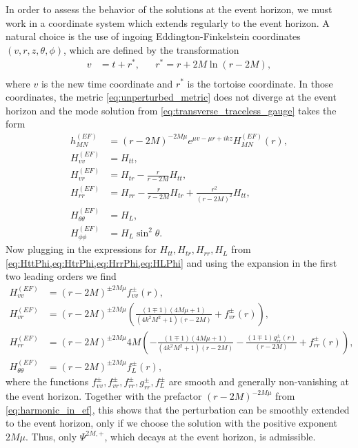 \documentclass[11pt,aip,jmp,amsmath,amssymb,draft]{revtex4-1}
\begin{document}
In order to assess the behavior of the solutions at the event horizon, we must work in a coordinate system which extends regularly to the event horizon. 
A natural choice is the use of ingoing Eddington-Finkelstein coordinates $(v,r,z,\theta,\phi)$, which are defined by the transformation
\begin{align}
    v &= t + r^*, && r^*= r + 2M \ln(r-2M), \\
\end{align}
where $v$ is the new time coordinate and $r^*$ is the tortoise coordinate. 
In those coordinates, the metric \cref{eq:unperturbed_metric} does not diverge at the event horizon and the mode solution from \cref{eq:transverse_traceless_gauge} takes the form
\begin{align}
    h_{MN}^{(EF)} &= (r-2M)^{-2M\mu} e^{\mu v - \mu r + ikz} H_{MN}^{(EF)}(r), \label{eq:harmonic_in_ef} \\
    H_{vv}^{(EF)} &= H_{tt}, \\
    H_{vr}^{(EF)} &= H_{tr} - \frac{r}{r-2M}H_{tt}, \\
    H_{rr}^{(EF)} &= H_{rr} - \frac{r}{r-2M}H_{tr} + \frac{r^2}{(r-2M)^2} H_{tt},\\ 
    H_{\theta\theta}^{(EF)} &= H_L, \\
    H_{\phi\phi}^{(EF)} &= H_L \sin^2\theta.
\end{align}
Now plugging in the expressions for $H_{tt}, H_{tr}, H_{rr}, H_L$ from \cref{eq:HttPhi,eq:HtrPhi,eq:HrrPhi,eq:HLPhi} and using the expansion in the first two leading orders we find
\begin{align}
    H_{vv}^{(EF)} &= (r-2M)^{\pm 2M\mu}f_{vv}^{\pm}(r),\\
    H_{vr}^{(EF)} &= (r-2M)^{\pm 2M\mu}\left(\frac{(1\mp 1) (4 M \mu+1)}{\left(4 k^2 M^2+1\right) (r-2 M)} + f_{vr}^{\pm}(r)\right),\\
    H_{rr}^{(EF)} &= (r-2M)^{\pm 2M\mu}4M\left(-\frac{(1\mp 1) (4 M \mu+1)}{\left(4 k^2 M^2+1\right) (r-2 M)} - \frac{(1\mp 1)g_{rr}^{\pm}(r)}{(r-2 M)} + f_{rr}^{\pm}(r)\right),\\
    H_{\theta\theta}^{(EF)} &= (r-2M)^{\pm 2M\mu}f_{L}^{\pm}(r),
\end{align}
where the functions $f_{vv}^{\pm}, f_{vr}^{\pm}, f_{rr}^{\pm}, g_{rr}^{\pm}, f_L^{\pm}$ are smooth and generally non-vanishing at the event horizon.
Together with the prefactor $(r-2M)^{-2M\mu}$ from \cref{eq:harmonic_in_ef}, this shows that the perturbation can be smoothly extended to the event horizon, only if we choose the solution with the positive exponent $2M\mu$. Thus, only $\Psi^{2M,+}$, which decays at the event horizon, is admissible.
\end{document}
